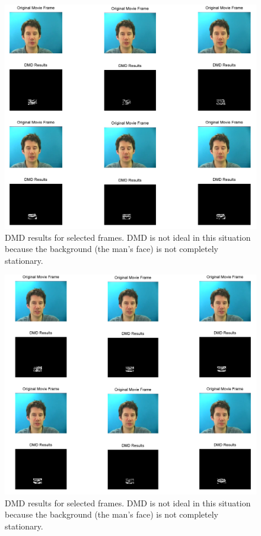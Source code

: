 \documentclass{article}
\begin{document}
\begin{figure}
	\centering
	\includegraphics[width=1\textwidth]{DMD1.png}
	\caption{DMD results for selected frames. DMD is not ideal in this situation because the background (the man's face) is not completely stationary.}
\end{figure}

\begin{figure}
	\centering
	\includegraphics[width=1\textwidth]{DMD2.png}
	\caption{DMD results for selected frames. DMD is not ideal in this situation because the background (the man's face) is not completely stationary.}
\end{figure}
\end{document}
